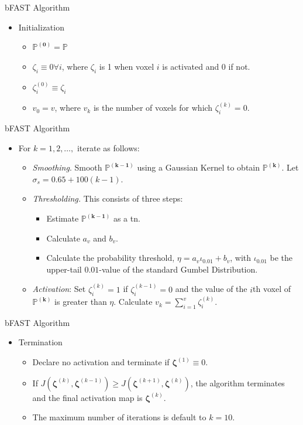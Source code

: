 \documentclass{beamer}
\begin{document}
\begin{frame}{bFAST Algorithm}
\begin{itemize}
\item Initialization
\begin{itemize}
\item $\bm{\mathbb{P}^{(0)}} = \bm{\mathbb{P}}$
\item $\zeta_i \equiv 0 \forall i$, where $\zeta_i$ is 1 when voxel $i$ is activated and 0 if not.
\item $\zeta_i^{(0)} \equiv \zeta_i$
\item $v_0 = v$, where $v_k$ is the number of voxels for which $\zeta_i^{(k)} = 0$.
\end{itemize}
\end{itemize}
\end{frame}

\begin{frame}{bFAST Algorithm}
\begin{itemize}
\item For $k=1,2,\dots,$ iterate as follows:
\begin{itemize}
\item \textit{Smoothing}. Smooth $\bm{\mathbb{P}^{(k-1)}}$ using a Gaussian Kernel to obtain $\bm{\mathbb{P}^{(k)}}$. Let $\sigma_s = 0.65 + 100(k - 1)$.
\item \textit{Thresholding.} This consists of three steps:
\begin{itemize}
\item Estimate $\bm{\mathbb{P}^{(k-1)}}$ as a \gls{tn}.
\item Calculate $a_v$ and $b_v$.
\item Calculate the probability threshold, $\eta=a_v\iota_{0.01}+b_v$, with $\iota_{0.01}$ be the upper-tail $0.01$-value of the standard Gumbel Distribution.
\end{itemize}
\item \textit{Activation}: Set $\zeta_i^{(k)} = 1$ if $\zeta_i^{(k-1)} = 0$ and the value of the $i$th voxel of $\bm{\mathbb{P}^{(k)}}$ is greater than $\eta$. Calculate $v_k=\sum_{i=1}^v\zeta_i^{(k)}$.
\end{itemize}
\end{itemize}
\end{frame}

\begin{frame}{bFAST Algorithm}
\begin{itemize}
\item Termination
\begin{itemize}
\item Declare no activation and terminate if $\bm{\zeta}^{(1)} \equiv 0$.
\item If $J(\bm{\zeta}^{(k)},\bm{\zeta}^{(k-1)}) \geq J(\bm{\zeta}^{(k+1)},\bm{\zeta}^{(k)})$, the algorithm terminates and the final activation map is $\bm{\zeta}^{(k)}$.
\item The maximum number of iterations is default to $k=10$.
\end{itemize}
\end{itemize}
\end{frame}
\end{document}
